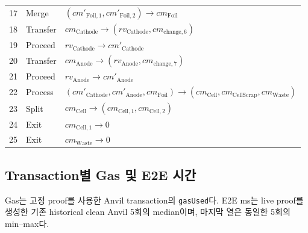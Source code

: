 \documentclass[11pt,a4paper]{extarticle}
\begin{document}
\begin{longtable}{@{}p{}p{}p{}@{}}
  17    & Merge    & $(cm'_{\mathrm{Foil},1},cm'_{\mathrm{Foil},2})\rightarrow cm_{\mathrm{Foil}}$          \\
  18    & Transfer & $cm_{\mathrm{Cathode}}\rightarrow(rv_{\mathrm{Cathode}},cm_{\mathrm{change},6})$       \\
  19    & Proceed  & $rv_{\mathrm{Cathode}}\rightarrow cm'_{\mathrm{Cathode}}$                              \\
  20    & Transfer & $cm_{\mathrm{Anode}}\rightarrow(rv_{\mathrm{Anode}},cm_{\mathrm{change},7})$           \\
  21    & Proceed  & $rv_{\mathrm{Anode}}\rightarrow cm'_{\mathrm{Anode}}$                                  \\
  22    & Process  & $(cm'_{\mathrm{Cathode}},cm'_{\mathrm{Anode}},cm_{\mathrm{Foil}})
                       \rightarrow(cm_{\mathrm{Cell}},cm_{\mathrm{CellScrap}},cm_{\mathrm{Waste}})$         \\
  23    & Split    & $cm_{\mathrm{Cell}}\rightarrow(cm_{\mathrm{Cell},1},cm_{\mathrm{Cell},2})$             \\
  24    & Exit     & $cm_{\mathrm{Cell},1}\rightarrow0$                                                     \\
  25    & Exit     & $cm_{\mathrm{Waste}}\rightarrow0$                                                      \\
  \bottomrule
\end{longtable}

\subsection{Transaction별 Gas 및 E2E 시간}

Gas는 고정 proof를 사용한 Anvil transaction의 \texttt{gasUsed}다. E2E ms는 live proof를
생성한 기존 historical clean Anvil 5회의 median이며, 마지막 열은 동일한 5회의 min--max다.
\end{document}
